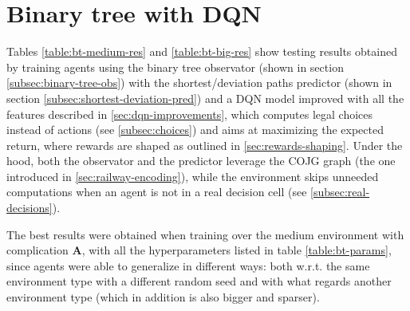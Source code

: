 \documentclass[a4paper,10pt]{report}
\begin{document}
\section*{Binary tree with DQN}\label{sec:bt-dqn-res}

Tables \ref{table:bt-medium-res} and \ref{table:bt-big-res} show testing results obtained by training agents using the binary tree observator (shown in section \ref{subsec:binary-tree-obs}) with the shortest/deviation paths predictor (shown in section \ref{subsec:shortest-deviation-pred}) and a DQN model improved with all the features described in \ref{sec:dqn-improvements}, which computes legal choices instead of actions (see \ref{subsec:choices}) and aims at maximizing the expected return, where rewards are shaped as outlined in \ref{sec:rewards-shaping}. Under the hood, both the observator and the predictor leverage the COJG graph (the one introduced in \ref{sec:railway-encoding}), while the environment skips unneeded computations when an agent is not in a real decision cell (see \ref{subsec:real-decisions}).

The best results were obtained when training over the medium environment with complication \textbf{A}, with all the hyperparameters listed in table \ref{table:bt-params}, since agents were able to generalize in different ways: both w.r.t. the same environment type with a different random seed and with what regards another environment type (which in addition is also bigger and sparser).
\end{document}
